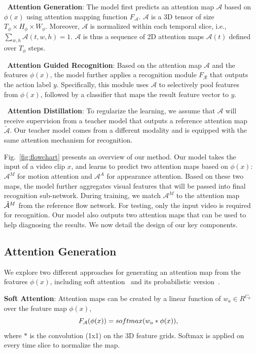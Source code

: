 \documentclass[10pt,twocolumn,letterpaper]{article}
\begin{document}
\noindent \textbullet\ \textbf{Attention Generation}: The model first predicts an attention map $\mathcal{A}$ based on $\phi(x)$ using attention mapping function $F_{\mathcal{A}}$. $\mathcal{A}$ is a 3D tensor of size $T_\phi \times H_\phi \times W_\phi$. Moreover, $\mathcal{A}$ is normalized within each temporal slice, i.e., $\sum_{w,h} \mathcal{A}(t,w,h)=1$. $\mathcal{A}$ is thus a sequence of 2D attention maps $\mathcal{A}(t)$ defined over $T_\phi$ steps. 

\noindent \textbullet\ \textbf{Attention Guided Recognition}: Based on the attention map $\mathcal{A}$ and the features $\phi(x)$, the model further applies a recognition module $F_{\mathcal{R}}$ that outputs the action label $y$. Specifically, this module uses $\mathcal{A}$ to selectively pool features from $\phi(x)$, followed by a classifier that maps the result feature vector to $y$.

\noindent \textbullet\ \textbf{Attention Distillation}: To regularize the learning, we assume that $\mathcal{A}$ will receive supervision from a teacher model that outputs a reference attention map $\mathcal{\tilde{A}}$. Our teacher model comes from a different modality and is equipped with the same attention mechanism for recognition.

Fig.\ \ref{fig:flowchart} presents an overview of our method. Our model takes the input of a video clip $x$, and learns to predict two attention maps based on $\phi(x)$: $\mathcal{A}^M$ for motion attention and $\mathcal{A}^A$ for appearance attention. Based on these two maps, the model further aggregates visual features that will be passed into final recognition sub-network. During training, we match $\mathcal{A}^M$ to the attention map $\mathcal{\Tilde{A}}^M$ from the reference flow network. For testing, only the input video is required for recognition. Our model also outputs two attention maps that can be used to help diagnosing the results. We now detail the design of our key components.

\subsection{Attention Generation}
We explore two different approaches for generating an attention map from the features $\phi(x)$, including soft attention~\cite{wang2017residual} and its probabilistic version~\cite{Li_2018_ECCV}.

\noindent \textbf{Soft Attention}: Attention maps can be created by a linear function of $w_a \in R^{C_\phi}$ over the feature map $\phi(x)$,
\begin{equation}
\small
    F_{\mathcal{A}}(\phi(x)) = softmax(w_a * \phi(x)),
\end{equation}
where $*$ is the convolution (1x1) on the 3D feature grids. Softmax is applied on every time slice to normalize the map.
\end{document}
